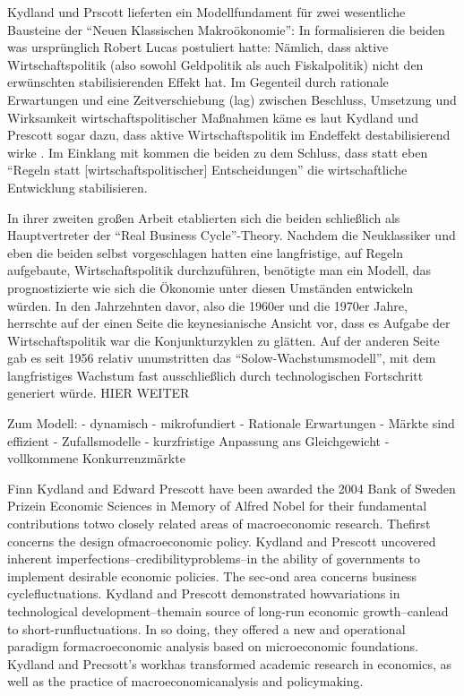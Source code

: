 Kydland und Prscott lieferten ein Modellfundament für zwei wesentliche Bausteine der "`Neuen Klassischen Makroökonomie"': In \textcite{Kydland1977} formalisieren die beiden was ursprünglich Robert Lucas postuliert hatte: Nämlich, dass aktive Wirtschaftspolitik (also sowohl Geldpolitik als auch Fiskalpolitik) nicht den erwünschten stabilisierenden Effekt hat. Im Gegenteil durch rationale Erwartungen und eine Zeitverschiebung (lag) zwischen Beschluss, Umsetzung und Wirksamkeit wirtschaftspolitischer Maßnahmen käme es laut Kydland und Prescott sogar dazu, dass aktive Wirtschaftspolitik im Endeffekt destabilisierend wirke \parencite[S. 486]{Kydland1977}. Im Einklang mit \textcite{Lucas1976} kommen die beiden zu dem Schluss, dass statt eben "`Regeln statt [wirtschaftspolitischer] Entscheidungen"' die wirtschaftliche Entwicklung stabilisieren.

In ihrer zweiten großen Arbeit \parencite{Kydland1982} etablierten sich die beiden schließlich als Hauptvertreter der "`Real Business Cycle"'-Theory. Nachdem die Neuklassiker und eben die beiden selbst \parencite{Kydland1977} vorgeschlagen hatten eine langfristige, auf Regeln aufgebaute, Wirtschaftspolitik durchzuführen, benötigte man ein Modell, das prognostizierte wie sich die Ökonomie unter diesen Umständen entwickeln würden. In den Jahrzehnten davor, also die 1960er und die 1970er Jahre, herrschte auf der einen Seite die keynesianische Ansicht vor, dass es Aufgabe der Wirtschaftspolitik war die Konjunkturzyklen zu glätten. Auf der anderen Seite gab es seit 1956 relativ unumstritten das "`Solow-Wachstumsmodell"', mit dem langfristiges Wachstum fast ausschließlich durch technologischen Fortschritt generiert würde.   HIER WEITER




Zum Modell:
- dynamisch
- mikrofundiert
- Rationale Erwartungen
- Märkte sind effizient
- Zufallsmodelle
- kurzfristige Anpassung ans Gleichgewicht
- vollkommene Konkurrenzmärkte








Finn Kydland and Edward Prescott have been awarded the 2004 Bank of Sweden Prizein Economic Sciences in Memory of Alfred Nobel for their fundamental contributions totwo closely related areas of macroeconomic research.  Thefirst concerns the design ofmacroeconomic policy. Kydland and Prescott uncovered inherent imperfections–credibilityproblems–in the ability of governments to implement desirable economic policies. The sec-ond area concerns business cyclefluctuations.  Kydland and Prescott demonstrated howvariations in technological development–themain source of long-run economic growth–canlead to short-runfluctuations. In so doing, they offered a new and operational paradigm formacroeconomic analysis based on microeconomic foundations. Kydland and Precsott’s workhas transformed academic research in economics, as well as the practice of macroeconomicanalysis and policymaking.









